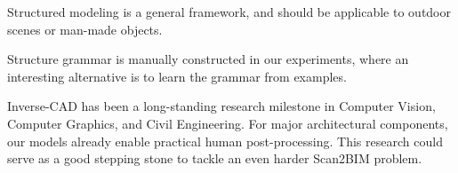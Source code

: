 Structured modeling is a general framework, and should be applicable to
outdoor scenes or man-made objects.
%

Structure grammar is manually constructed in our experiments, where an
interesting alternative is to learn the grammar from examples.

 Inverse-CAD has been a
long-standing research milestone in Computer Vision, Computer Graphics,
and Civil Engineering.  For major architectural components, our models
already enable practical human post-processing. This research could
serve as a good stepping stone to tackle an even harder Scan2BIM
problem.

